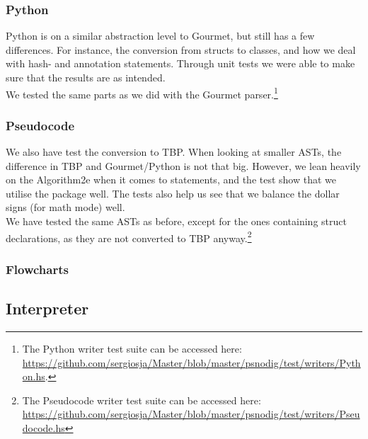 \subsubsection{Python}

Python is on a similar abstraction level to Gourmet, but still has a few differences. For instance, the conversion from structs to classes, and how we deal with hash- and annotation statements. Through unit tests we were able to make sure that the results are as intended. \\

We tested the same parts as we did with the Gourmet parser.\footnote{The Python writer test suite can be accessed here: \url{https://github.com/sergiosja/Master/blob/master/psnodig/test/writers/Python.hs}.}

\subsubsection{Pseudocode}

We also have test the conversion to TBP. When looking at smaller ASTs, the difference in TBP and Gourmet/Python is not that big. However, we lean heavily on the Algorithm2e when it comes to statements, and the test show that we utilise the package well. The tests also help us see that we balance the dollar signs (for math mode) well. \\

We have tested the same ASTs as before, except for the ones containing struct declarations, as they are not converted to TBP anyway.\footnote{The Pseudocode writer test suite can be accessed here: \url{https://github.com/sergiosja/Master/blob/master/psnodig/test/writers/Pseudocode.hs}}

\subsubsection{Flowcharts}


\subsection{Interpreter}

